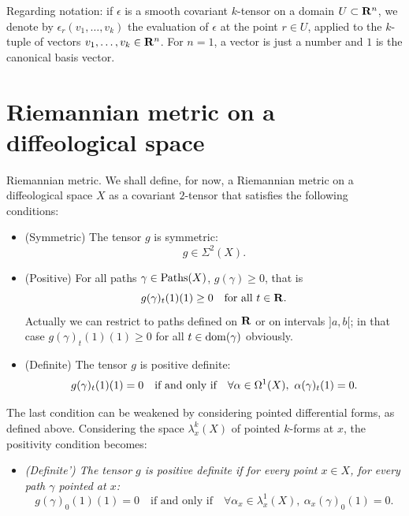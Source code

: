 Regarding notation: if $\epsilon$ is a smooth covariant $k$-tensor on a domain $U \subset \mathbf{R}^n$,
we denote by $\epsilon_r(v_1,\ldots,v_k)$ the evaluation of $\epsilon$ at the point $r \in U$,
applied to the $k$-tuple of vectors $v_1,\ldots,v_k \in \mathbf{R}^n$.
For $n=1$,
a vector is just a number and $1$ is the canonical basis vector.

\section{Riemannian metric on a diffeological space}

\begin{Article}{Riemannian metric.}{}
  We shall define,
  for now,
  a Riemannian metric on a diffeological space $X$ as a covariant $2$-tensor that satisfies the following conditions:
  
  \begin{itemize}
    \item (Symmetric) The tensor $g$ is symmetric:
    $$
      g \in \Sigma^2(X).
      $$
    \item (Positive) For all paths $\gamma \in \operatorname{Paths}(X)$,
    $g(\gamma) \geq 0$,
    that is
    $$
      g(\gamma)_t(1)(1) \geq 0 \quad \text{for all $t\in \mathbf{R}$}.
      $$
    Actually we can restrict to paths defined on $\mathbf{R}$ or on intervals $]a,b[$;
    in that case $g(\gamma)_t(1)(1) \geq 0$ for all $t \in \mathrm{dom}(\gamma)$ obviously.
    \item (Definite) The tensor $g$ is positive definite:
    $$
      g(\gamma)_t(1)(1) = 0 \quad \text{if and only if} \quad \forall \alpha \in \DForms^1(X), \ \alpha(\gamma)_t(1) = 0.
      $$
  \end{itemize}
\end{Article}

The last condition can be weakened by considering pointed differential forms,
as defined above.
Considering the space $\lambda^k_x(X)$ of pointed $k$-forms at $x$,
the positivity condition becomes:

\begin{itemize}
  \item {\it {\upshape(Definite')} The tensor $g$ is positive definite if for every point $x \in X$,
  for every path $\gamma$ pointed at $x$:
  $$
    g(\gamma)_0(1)(1) = 0 \quad \text{if and only if} \quad \forall \alpha_x \in \lambda_x^1(X), \ \alpha_x(\gamma)_0(1) = 0.
    $$
  }
\end{itemize}

